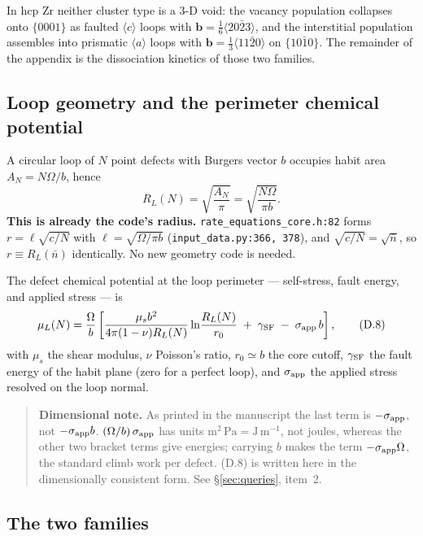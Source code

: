 \documentclass[11pt]{article}
\newcommand{\aloop}{\ensuremath{\langle a\rangle}}
\newcommand{\cloop}{\ensuremath{\langle c\rangle}}
\newcommand{\fbk}{\discretionary{}{}{}}   %
\newcommand{\file}[1]{\texttt{\small #1}}
\newcommand{\GSF}{\gamma_{\rm SF}}
\begin{document}
In hcp Zr neither cluster type is a 3-D void: the vacancy population collapses
onto $\{0001\}$ as faulted \cloop{} loops with
$\mathbf b=\tfrac16\langle20\bar23\rangle$, and the interstitial population
assembles into prismatic \aloop{} loops with
$\mathbf b=\tfrac13\langle11\bar20\rangle$ on $\{10\bar10\}$.  The remainder
of the appendix is the dissociation kinetics of those two families.

\subsection{Loop geometry and the perimeter chemical potential}

A circular loop of $N$ point defects with Burgers vector $b$ occupies habit
area $A_N=N\Omega/b$, hence
\begin{equation*}
R_L(N)=\sqrt{\frac{A_N}{\pi}}=\sqrt{\frac{N\Omega}{\pi b}} .
\tag{D.7}
\end{equation*}
\textbf{This is already the code's radius.}
\file{rate\_\fbk equations\_\fbk core.\fbk h:82} forms $r=\ell\sqrt{c/N}$ with
$\ell=\sqrt{\Omega/\pi b}$ (\file{input\_\fbk data.\fbk py:366, 378}), and
$\sqrt{c/N}=\sqrt{\bar n}$, so $r\equiv R_L(\bar n)$ identically.  No new
geometry code is needed.

The defect chemical potential at the loop perimeter --- self-stress, fault
energy, and applied stress --- is
\begin{equation*}
\mu_L(N)=\frac{\Omega}{b}\left[
  \frac{\mu_s b^{2}}{4\pi(1-\nu)R_L(N)}\ln\!\frac{R_L(N)}{r_0}
  \;+\;\GSF\;-\;\sigma_{\rm app}\,b\right],
\tag{D.8}
\end{equation*}
with $\mu_s$ the shear modulus, $\nu$ Poisson's ratio, $r_0\simeq b$ the core
cutoff, $\GSF$ the fault energy of the habit plane (zero for a perfect loop),
and $\sigma_{\rm app}$ the applied stress resolved on the loop normal.

\begin{quote}\small\color{red!55!black}
\textbf{Dimensional note.}  As printed in the manuscript the last term is
$-\sigma_{\rm app}$, not $-\sigma_{\rm app}b$.  $(\Omega/b)\,\sigma_{\rm app}$
has units $\mathrm{m^{2}\,Pa}=\mathrm{J\,m^{-1}}$, not joules, whereas the
other two bracket terms give energies; carrying $b$ makes the term
$-\sigma_{\rm app}\Omega$, the standard climb work per defect.  (D.8) is
written here in the dimensionally consistent form.  See
\S\ref{sec:queries}, item~2.
\end{quote}

\subsection{The two families}
\end{document}
